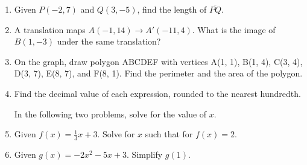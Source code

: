 \documentclass[12pt, twoside]{article}
\begin{document}
\begin{enumerate}
\newpage

  \item Given $P(-2,7)$ and $Q(3,-5)$, find the length of $\overline{PQ}$.
      \vspace{4cm}

  \item A translation maps $A(-1,14) \rightarrow A'(-11,4)$. What is the image of $B(1,-3)$ under the same translation?  \vspace{3cm}

  \item On the graph, draw polygon ABCDEF with vertices A(1, 1), B(1, 4), C(3, 4), D(3, 7), E(8, 7), and F(8, 1). Find the perimeter and the area of the polygon.\\[1cm]
  \vspace{2cm}

\newpage
  \item Find the decimal value of each expression, rounded to the nearest hundredth.
  \begin{enumerate}
  \end{enumerate}
  \vspace{0.5cm}

  In the following two problems, solve for the value of $x$.
    \vspace{4cm}

  \item Given $f(x)=\frac{1}{3} x+3$. Solve for $x$ such that for $f(x)=2$. \vspace{5cm}
  \item Given $g(x)=-2x^2-5x+3$. Simplify $g(1)$. \vspace{2cm}
  

\end{enumerate}
\end{document}
